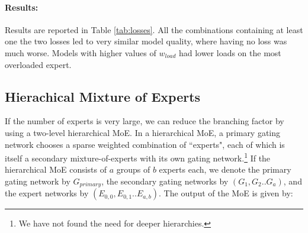 \documentclass{article}
\begin{document}
\begin{table}[h!]
\caption{Experiments with different combinations of losses. }
\label{tab:losses}
\begin{center}
\setlength\tabcolsep{3pt}
\end{center}
\end{table}

\paragraph{Results:} Results are reported in Table \ref{tab:losses}.  All the combinations containing at least one the two losses led to very similar model quality, where having no loss was much worse.  Models with higher values of $w_{load}$ had lower loads on the most overloaded expert.

\subsection{Hierachical Mixture of Experts} \label{sec:hierarchical}  If the number of experts is very large, we can reduce the branching factor by using a two-level hierarchical MoE.  In a hierarchical MoE, a primary gating network chooses a sparse weighted combination of ``experts", each of which is itself a secondary mixture-of-experts with its own gating network.\footnote{ We have not found the need for deeper hierarchies.}  If the hierarchical MoE consists of $a$ groups of $b$ experts each, we denote the primary gating network by $G_{primary}$, the secondary gating networks by $(G_1, G_2 .. G_a)$, and the expert networks by $(E_{0,0}, E_{0,1} .. E_{a,b})$.   The output of the MoE is given by:
\end{document}
